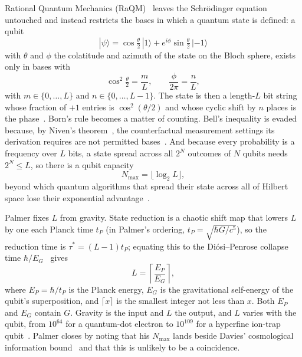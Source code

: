 \documentclass[aps,prd,twocolumn,superscriptaddress,nofootinbib,showkeys]{revtex4-2}
\begin{document}
Rational Quantum Mechanics (RaQM)~\cite{palmer2020,palmer2026,palmer2026b,palmer2026c} leaves the Schr\"odinger equation untouched and instead restricts the bases in which a quantum state is defined: a qubit
\begin{equation}
|\psi\rangle = \cos\tfrac{\theta}{2}\,|1\rangle + e^{i\phi}\sin\tfrac{\theta}{2}\,|{-1}\rangle
\label{eq:qubit}
\end{equation}
with $\theta$ and $\phi$ the colatitude and azimuth of the state on the Bloch sphere, exists only in bases with
\begin{equation}
\cos^2\tfrac{\theta}{2} = \frac{m}{L},\qquad \frac{\phi}{2\pi} = \frac{n}{L},
\label{eq:raqm}
\end{equation}
with $m\in\{0,\dots,L\}$ and $n\in\{0,\dots,L-1\}$. The state is then a length-$L$ bit string whose fraction of $+1$ entries is $\cos^2(\theta/2)$ and whose cyclic shift by $n$ places is the phase~\cite{palmer2026}. Born's rule becomes a matter of counting. Bell's inequality is evaded because, by Niven's theorem~\cite{niven1956,jahnel2010}, the counterfactual measurement settings its derivation requires are not permitted bases~\cite{palmer2024,palmer2026b}. And because every probability is a frequency over $L$ bits, a state spread across all $2^N$ outcomes of $N$ qubits needs $2^N \le L$, so there is a qubit capacity
\begin{equation}
N_{\max} = \lfloor\log_2 L\rfloor ,
\label{eq:nmax}
\end{equation}
beyond which quantum algorithms that spread their state across all of Hilbert space lose their exponential advantage~\cite{palmer2026,korytko2026c}.

Palmer fixes $L$ from gravity. State reduction is a chaotic shift map that lowers $L$ by one each Planck time $t_P$ (in Palmer's ordering, $t_P = \sqrt{\hbar G/c^5}$), so the reduction time is $\tau^* = (L-1)t_P$; equating this to the Di\'osi--Penrose collapse time $\hbar/E_G$~\cite{diosi1989,penrose1996} gives
\begin{equation}
L = \left\lceil\frac{E_P}{E_G}\right\rceil ,
\label{eq:palmerL}
\end{equation}
where $E_P = \hbar/t_P$ is the Planck energy, $E_G$ is the gravitational self-energy of the qubit's superposition, and $\lceil x\rceil$ is the smallest integer not less than $x$. Both $E_P$ and $E_G$ contain $G$. Gravity is the input and $L$ the output, and $L$ varies with the qubit, from $10^{64}$ for a quantum-dot electron to $10^{109}$ for a hyperfine ion-trap qubit~\cite{palmer2026}. Palmer closes by noting that his $N_{\max}$ lands beside Davies' cosmological information bound~\cite{davies2007,lloyd2002} and that this is unlikely to be a coincidence.
\end{document}
